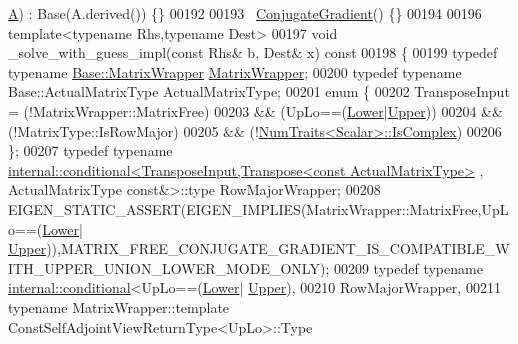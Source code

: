\begin{DoxyCode}
      \hyperlink{group___core___module_class_eigen_1_1_matrix}{A}) : Base(A.derived()) \{\}
00192 
00193   ~\hyperlink{group___iterative_linear_solvers___module_class_eigen_1_1_conjugate_gradient}{ConjugateGradient}() \{\}
00194 
00196   \textcolor{keyword}{template}<\textcolor{keyword}{typename} Rhs,\textcolor{keyword}{typename} Dest>
00197   \textcolor{keywordtype}{void} \_solve\_with\_guess\_impl(\textcolor{keyword}{const} Rhs& b, Dest& x)\textcolor{keyword}{ const}
00198 \textcolor{keyword}{  }\{
00199     \textcolor{keyword}{typedef} \textcolor{keyword}{typename} \hyperlink{class_eigen_1_1internal_1_1generic__matrix__wrapper}{Base::MatrixWrapper} \hyperlink{class_eigen_1_1internal_1_1generic__matrix__wrapper}{MatrixWrapper};
00200     \textcolor{keyword}{typedef} \textcolor{keyword}{typename} Base::ActualMatrixType ActualMatrixType;
00201     \textcolor{keyword}{enum} \{
00202       TransposeInput  =   (!MatrixWrapper::MatrixFree)
00203                       &&  (UpLo==(\hyperlink{group__enums_gga39e3366ff5554d731e7dc8bb642f83cda891792b8ed394f7607ab16dd716f60e6}{Lower}|\hyperlink{group__enums_gga39e3366ff5554d731e7dc8bb642f83cda6bcb58be3b8b8ec84859ce0c5ac0aaec}{Upper}))
00204                       &&  (!MatrixType::IsRowMajor)
00205                       &&  (!\hyperlink{group___core___module_struct_eigen_1_1_num_traits}{NumTraits<Scalar>::IsComplex})
00206     \};
00207     \textcolor{keyword}{typedef} \textcolor{keyword}{typename} 
      \hyperlink{struct_eigen_1_1internal_1_1conditional}{internal::conditional<TransposeInput,Transpose<const ActualMatrixType>}
      , ActualMatrixType \textcolor{keyword}{const}&>::type RowMajorWrapper;
00208     EIGEN\_STATIC\_ASSERT(EIGEN\_IMPLIES(MatrixWrapper::MatrixFree,UpLo==(\hyperlink{group__enums_gga39e3366ff5554d731e7dc8bb642f83cda891792b8ed394f7607ab16dd716f60e6}{Lower}|
      \hyperlink{group__enums_gga39e3366ff5554d731e7dc8bb642f83cda6bcb58be3b8b8ec84859ce0c5ac0aaec}{Upper})),MATRIX\_FREE\_CONJUGATE\_GRADIENT\_IS\_COMPATIBLE\_WITH\_UPPER\_UNION\_LOWER\_MODE\_ONLY);
00209     \textcolor{keyword}{typedef} \textcolor{keyword}{typename} \hyperlink{struct_eigen_1_1internal_1_1conditional}{internal::conditional}<UpLo==(\hyperlink{group__enums_gga39e3366ff5554d731e7dc8bb642f83cda891792b8ed394f7607ab16dd716f60e6}{Lower}|
      \hyperlink{group__enums_gga39e3366ff5554d731e7dc8bb642f83cda6bcb58be3b8b8ec84859ce0c5ac0aaec}{Upper}),
00210                                            RowMajorWrapper,
00211                                            \textcolor{keyword}{typename} MatrixWrapper::template 
      ConstSelfAdjointViewReturnType<UpLo>::Type

\end{DoxyCode}
